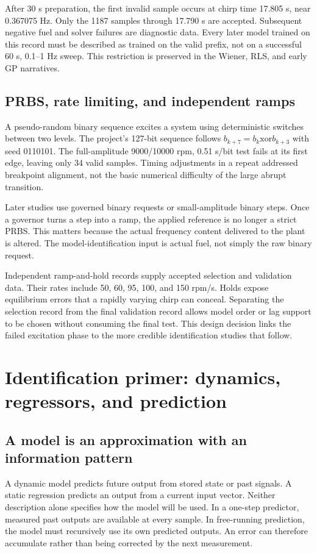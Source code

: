 After 30 s preparation, the first invalid sample occurs at chirp time 17.805 s, near 0.367075 Hz. Only the 1187 samples through 17.790 s are accepted. Subsequent negative fuel and solver failures are diagnostic data. Every later model trained on this record must be described as trained on the valid prefix, not on a successful 60 s, 0.1--1 Hz sweep. This restriction is preserved in the Wiener, RLS, and early GP narratives.

\subsection{PRBS, rate limiting, and independent ramps}
A pseudo-random binary sequence excites a system using deterministic switches between two levels. The project's 127-bit sequence follows $b_{k+7}=b_k\mathbin{\mathrm{xor}}b_{k+3}$ with seed 0110101. The full-amplitude 9000/10000 rpm, 0.51 s/bit test fails at its first edge, leaving only 34 valid samples. Timing adjustments in a repeat addressed breakpoint alignment, not the basic numerical difficulty of the large abrupt transition.

Later studies use governed binary requests or small-amplitude binary steps. Once a governor turns a step into a ramp, the applied reference is no longer a strict PRBS. This matters because the actual frequency content delivered to the plant is altered. The model-identification input is actual fuel, not simply the raw binary request.

Independent ramp-and-hold records supply accepted selection and validation data. Their rates include 50, 60, 95, 100, and 150 rpm/s. Holds expose equilibrium errors that a rapidly varying chirp can conceal. Separating the selection record from the final validation record allows model order or lag support to be chosen without consuming the final test. This design decision links the failed excitation phase to the more credible identification studies that follow.



\section{Identification primer: dynamics, regressors, and prediction}
\subsection{A model is an approximation with an information pattern}
A dynamic model predicts future output from stored state or past signals. A static regression predicts an output from a current input vector. Neither description alone specifies how the model will be used. In a one-step predictor, measured past outputs are available at every sample. In free-running prediction, the model must recursively use its own predicted outputs. An error can therefore accumulate rather than being corrected by the next measurement.

